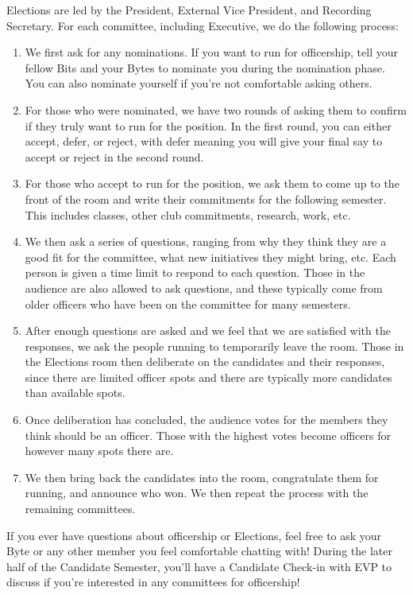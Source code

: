 \documentclass[11pt, article, oneside]{memoir}
\begin{document}
        Elections are led by the President, External Vice President, and Recording Secretary. For each committee, including Executive, we do the following process:
        \begin{enumerate}
            \item We first ask for any nominations. If you want to run for officership, tell your fellow Bits and your Bytes to nominate you during the nomination phase. You can also nominate yourself if you're not comfortable asking others.
            \item For those who were nominated, we have two rounds of asking them to confirm if they truly want to run for the position. In the first round, you can either accept, defer, or reject, with defer meaning you will give your final say to accept or reject in the second round.
            \item For those who accept to run for the position, we ask them to come up to the front of the room and write their commitments for the following semester. This includes classes, other club commitments, research, work, etc. 
            \item We then ask a series of questions, ranging from why they think they are a good fit for the committee, what new initiatives they might bring, etc. Each person is given a time limit to respond to each question. Those in the audience are also allowed to ask questions, and these typically come from older officers who have been on the committee for many semesters.
            \item After enough questions are asked and we feel that we are satisfied with the responses, we ask the people running to temporarily leave the room. Those in the Elections room then deliberate on the candidates and their responses, since there are limited officer spots and there are typically more candidates than available spots.
            \item Once deliberation has concluded, the audience votes for the members they think should be an officer. Those with the highest votes become officers for however many spots there are.
            \item We then bring back the candidates into the room, congratulate them for running, and announce who won. We then repeat the process with the remaining committees.
        \end{enumerate}

        If you ever have questions about officership or Elections, feel free to ask your Byte or any other member you feel comfortable chatting with! During the later half of the Candidate Semester, you'll have a Candidate Check-in with EVP to discuss if you're interested in any committees for officership!
\end{document}
